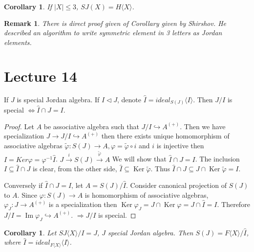 \documentclass{article}
\newtheorem{corollary}[theorem]{Corollary}
\newtheorem{remark}[theorem]{Remark}
\begin{document}
\begin{corollary}
    If $|X| \leq 3$, $SJ(X) = H\langle X \rangle$.  
\end{corollary}

\begin{remark}
    There is direct proof given of Corollary given by Shirshov. He described an algorithm to write symmetric element in 3 letters as Jordan elements.  
\end{remark}

\section{Lecture 14}

\begin{theorem} 
If $J$ is special Jordan algebra. If $I \triangleleft J$, denote $\hat{I} = ideal_{S(J)} \langle I \rangle$.  
Then $J/I$ is special $\Leftrightarrow \hat{I} \cap J = I$.  
\end{theorem}
\begin{proof}
Let $A$ be associative algebra such that $J/I \hookrightarrow A^{(+)}$. Then we have specialization $J \to J/I \hookrightarrow A^{(+)}$ then there exists unique homomorphism of associative algebras $\tilde{\varphi}: S(J) \to A, \varphi = \tilde{\varphi} \circ i$ and $i$ is injective then $I = Ker \varphi = \varphi^{-1} \hat{I}$.  
$J \xrightarrow{i} S(J) \xrightarrow{\tilde{\varphi}} A$ We will show that $\hat{I} \cap J = I$. The inclusion $I \subseteq \hat{I} \cap J$ is clear, from the other side, $\hat{I} \subseteq \operatorname{Ker} \tilde{\varphi}$. Thus $\hat{I} \cap J \subseteq J \cap \operatorname{Ker} \tilde{\varphi} = I$.  

Conversely if $\hat{I} \cap J = I$, let $A = S(J)/\hat{I}$. Consider canonical projection of $S(J)$ to $A$. Since $\varphi: S(J) \to A$ is homomorphism of associative algebras, $\varphi_J: J \to A^{(+)}$ is a specialization then $\operatorname{Ker} \varphi_J = J \cap\operatorname{Ker} \varphi = J \cap \hat{I} = I$. Therefore $J/I = \operatorname{Im} \varphi_J \hookrightarrow A^{(+)}$.  
$\Rightarrow J/I$ is special.  
\end{proof}

\begin{corollary} 
    Let $ SJ\langle X \rangle/I=J$, $ J $ special Jordan algebra. Then $S(J) = F\langle X \rangle/\hat{I}$, where $\hat{I} = ideal_{F\langle X \rangle}\langle I \rangle$.  
\end{corollary}
\end{document}
